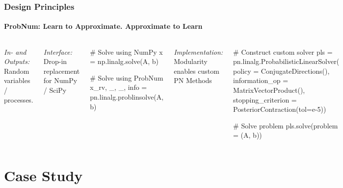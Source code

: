 \documentclass[10pt,usepdftitle=false,aspectratio=169]{beamer}
\begin{document}
\begin{frame}[fragile]\frametitle{Design Principles}
	\framesubtitle{ProbNum: Learn to Approximate. Approximate to Learn}

	\begin{columns}[totalwidth=\textwidth]

		\emph{In- and Outputs:} Random variables / processes.
		\vspace{2ex}

		\emph{Interface:} Drop-in replacement for NumPy / SciPy

		\begin{python}
		# Solve using NumPy
		x = np.linalg.solve(A, b)

		# Solve using ProbNum
		x_rv, _, _, info = pn.linalg.problinsolve(A, b)\end{python}
		\vspace{2ex}

		\emph{Implementation:} Modularity enables custom PN Methods

		\begin{python}
		# Construct custom solver
		pls = pn.linalg.ProbabilisticLinearSolver(
			policy = ConjugateDirections(),
			information_op = MatrixVectorProduct(),
			stopping_criterion = PosteriorContraction(tol=e-5))
			
		# Solve problem
		pls.solve(problem = (A, b))\end{python}

		\centering
		\vspace{-3ex}
		\href{https://github.com/probabilistic-numerics/probnum/}{\includegraphics[scale=0.3]{figures/probnum_logo_text.png}}

	\end{columns}

\end{frame}

\section{Case Study}
\end{document}
